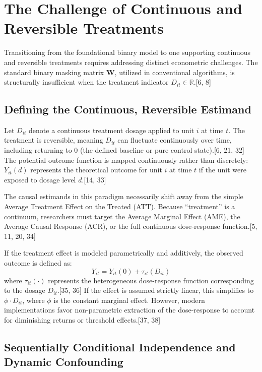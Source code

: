 \documentclass{article}
\begin{document}
\section{The Challenge of Continuous and Reversible Treatments}

Transitioning from the foundational binary model to one supporting continuous and reversible treatments requires addressing distinct econometric challenges. The standard binary masking matrix $\mathbf{W}$, utilized in conventional algorithms, is structurally insufficient when the treatment indicator $D_{it} \in \mathbb{R}$.[6, 8] 

\subsection{Defining the Continuous, Reversible Estimand}

Let $D_{it}$ denote a continuous treatment dosage applied to unit $i$ at time $t$. The treatment is reversible, meaning $D_{it}$ can fluctuate continuously over time, including returning to $0$ (the defined baseline or pure control state).[6, 21, 32] The potential outcome function is mapped continuously rather than discretely: $Y_{it}(d)$ represents the theoretical outcome for unit $i$ at time $t$ if the unit were exposed to dosage level $d$.[14, 33]

The causal estimands in this paradigm necessarily shift away from the simple Average Treatment Effect on the Treated (ATT). Because ``treatment'' is a continuum, researchers must target the Average Marginal Effect (AME), the Average Causal Response (ACR), or the full continuous dose-response function.[5, 11, 20, 34] 

If the treatment effect is modeled parametrically and additively, the observed outcome is defined as:
$$Y_{it} = Y_{it}(0) + \tau_{it}(D_{it})$$
where $\tau_{it}(\cdot)$ represents the heterogeneous dose-response function corresponding to the dosage $D_{it}$.[35, 36] If the effect is assumed strictly linear, this simplifies to $\phi \cdot D_{it}$, where $\phi$ is the constant marginal effect. However, modern implementations favor non-parametric extraction of the dose-response to account for diminishing returns or threshold effects.[37, 38]

\subsection{Sequentially Conditional Independence and Dynamic Confounding}
\end{document}
